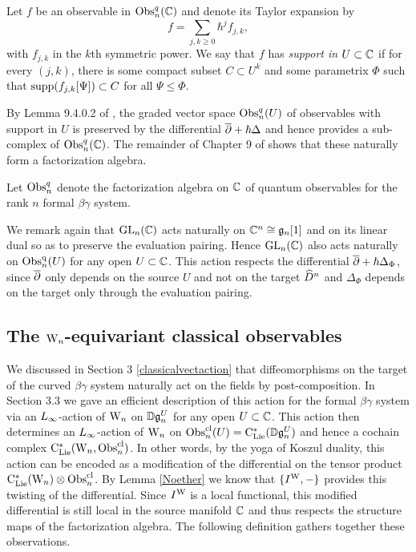 \begin{dfn}
Let $f$ be an observable in ${\rm Obs}^q_n(\mathbb C)$ and denote its Taylor expansion by
\[
f = \sum_{j,k \geq 0} \hbar^j f_{j,k},
\]
with $f_{j,k}$ in the $k$th symmetric power. 
We say that $f$ has \emph{support in $U \subset \mathbb C$} if 
for every $(j,k)$, there is some compact subset $C \subset U^k$ and some parametrix $\Phi$
such that ${\rm supp}(f_{j,k}[\Psi]) \subset C$ for all $\Psi \leq \Phi$.
\end{dfn}

By Lemma 9.4.0.2 of \cite{CG}, the graded vector space ${\rm Obs}^q_n(U)$ of observables with support in $U$
is preserved by the differential $\overline{\partial} + \hbar \Delta$ and hence provides a sub-complex of ${\rm Obs}^q_n(\mathbb C)$.
The remainder of Chapter 9 of \cite{CG} shows that these naturally form a factorization algebra.

\begin{dfn}\label{noneq quantum obs}
Let ${\rm Obs}^q_n$ denote the factorization algebra on $\mathbb C$ of quantum observables for the rank $n$ formal $\beta\gamma$ system.
\end{dfn}

We remark again that ${\rm GL}_n(\mathbb C)$ acts naturally on $\mathbb C^n \cong \mathfrak{g}_n[1]$
and on its linear dual so as to preserve the evaluation pairing.
Hence ${\rm GL}_n(\mathbb C)$ also acts naturally on ${\rm Obs}^{\rm q}_n(U)$ for any open $U \subset \mathbb C$.
This action respects the differential $\overline{\partial} + \hbar \Delta_\Phi$, 
since $\overline{\partial}$ only depends on the source $U$ and not on the target $\widehat{D}^n$
and $\Delta_\Phi$ depends on the target only through the evaluation pairing.

\subsection{The ${{\rm W}_n}$-equivariant classical observables}

We discussed in Section 3 \ref{classicalvectaction} that 
diffeomorphisms on the target of the curved $\beta\gamma$ system 
naturally act on the fields by post-composition.
In Section 3.3 we gave an efficient description of this action for the formal $\beta\gamma$ system
via an $\L8$-action of ${{\rm W}_n}$ on $\mathbb D\mathfrak{g}_n^U$ for any open $U \subset \mathbb C$.
This action then determines an $\L8$-action of ${{\rm W}_n}$ on ${\rm Obs}^{\rm cl}_n(U) = {\rm C}_{\rm Lie}^*(\mathbb D\mathfrak{g}_n^U)$
and hence a cochain complex ${\rm C}_{\rm Lie}^*({{\rm W}_n},{\rm Obs}^{\rm cl}_n)$.
In other words, by the yoga of Koszul duality, 
this action can be encoded as a modification of the differential on the tensor product ${\rm C}_{\rm Lie}^*({{\rm W}_n}) \otimes {\rm Obs}^{\rm cl}_n$.
By Lemma \ref{Noether} we know that $\{I^{\rm W},-\}$ provides this twisting of the differential.
Since $I^{\rm W}$ is a local functional, this modified differential is still local in the source manifold $\mathbb C$
and thus respects the structure maps of the factorization algebra.
The following definition gathers together these observations.

